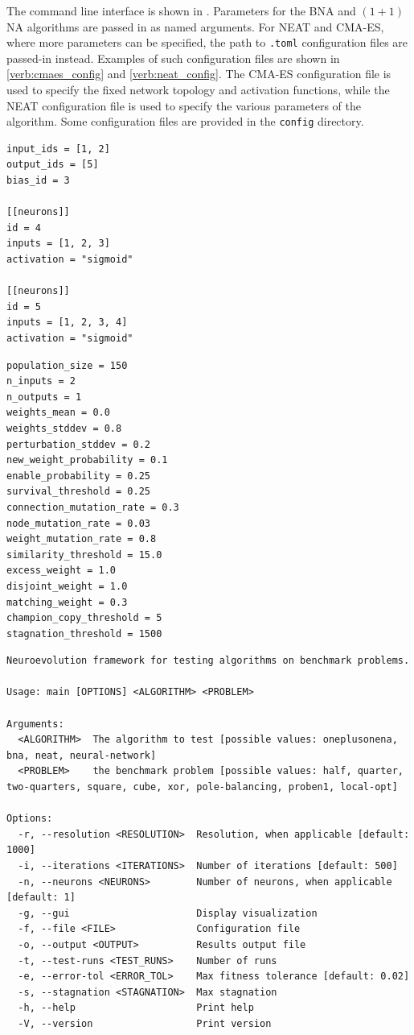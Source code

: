 The command line interface is shown in . Parameters for the BNA and $(1 + 1)$ NA algorithms are passed in as named arguments. For NEAT and CMA-ES, where more
parameters can be specified, the path to \texttt{.toml} configuration files are passed-in instead. Examples of such configuration files are shown in \ref{verb:cmaes_config}
and \ref{verb:neat_config}. The CMA-ES configuration file is used to specify the fixed network topology and activation functions, while the NEAT configuration file
is used to specify the various parameters of the algorithm. Some configuration files are provided in the \texttt{config} directory.

\begin{lstlisting}[label=verb:cmaes_config,caption=Example of configuration File for CMAE-ES,float,frame=tb]
input_ids = [1, 2]
output_ids = [5]
bias_id = 3

[[neurons]]
id = 4
inputs = [1, 2, 3]
activation = "sigmoid"

[[neurons]]
id = 5
inputs = [1, 2, 3, 4]
activation = "sigmoid"
\end{lstlisting}

\begin{lstlisting}[label=verb:neat_config,caption=Example of configuration File for NEAT,float,frame=tb]
population_size = 150
n_inputs = 2
n_outputs = 1
weights_mean = 0.0
weights_stddev = 0.8
perturbation_stddev = 0.2
new_weight_probability = 0.1
enable_probability = 0.25
survival_threshold = 0.25
connection_mutation_rate = 0.3
node_mutation_rate = 0.03
weight_mutation_rate = 0.8
similarity_threshold = 15.0
excess_weight = 1.0
disjoint_weight = 1.0
matching_weight = 0.3
champion_copy_threshold = 5
stagnation_threshold = 1500
\end{lstlisting}

\begin{lstlisting}[label=verb:cli,caption=Command line interface,float,frame=tb]
Neuroevolution framework for testing algorithms on benchmark problems.

Usage: main [OPTIONS] <ALGORITHM> <PROBLEM>

Arguments:
  <ALGORITHM>  The algorithm to test [possible values: oneplusonena, bna, neat, neural-network]
  <PROBLEM>    the benchmark problem [possible values: half, quarter, two-quarters, square, cube, xor, pole-balancing, proben1, local-opt]

Options:
  -r, --resolution <RESOLUTION>  Resolution, when applicable [default: 1000]
  -i, --iterations <ITERATIONS>  Number of iterations [default: 500]
  -n, --neurons <NEURONS>        Number of neurons, when applicable [default: 1]
  -g, --gui                      Display visualization
  -f, --file <FILE>              Configuration file
  -o, --output <OUTPUT>          Results output file
  -t, --test-runs <TEST_RUNS>    Number of runs
  -e, --error-tol <ERROR_TOL>    Max fitness tolerance [default: 0.02]
  -s, --stagnation <STAGNATION>  Max stagnation
  -h, --help                     Print help
  -V, --version                  Print version
\end{lstlisting}

